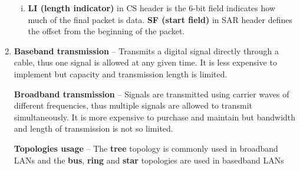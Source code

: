 \documentclass[a4paper, 11pt]{article}
\begin{document}
\begin{enumerate}
\begin{enumerate}[i)]
				\item %
					\textbf{LI (length indicator)} in CS header is the 6-bit field indicates how much of the final packet is data.
					\textbf{SF (start field)} in SAR header defines the offset from the beginning of the packet.
			\end{enumerate}

		\item %
			\textbf{Baseband transmission} -- Transmits a digital signal directly through a cable, thus one signal is allowed
			at any given time. It is less expensive to implement but capacity and transmission length is limited.

			\textbf{Broadband transmission} -- Signals are transmitted using carrier waves of different frequencies, thus
			multiple signals are allowed to transmit simultaneously. It is more expensive to purchase and maintain but
			bandwidth and length of transmission is not so limited.

			\textbf{Topologies usage} -- The \textbf{tree} topology is commonly used in broadband LANs and the \textbf{bus},
			\textbf{ring} and \textbf{star} topologies are used in basedband LANs


\end{enumerate}
\end{document}
